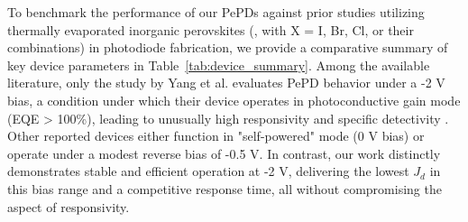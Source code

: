 To benchmark the performance of our PePDs against prior studies utilizing thermally evaporated inorganic perovskites (, with X = I, Br, Cl, or their combinations) in photodiode fabrication, we provide a comparative summary of key device parameters in Table~\ref{tab:device_summary}. Among the available literature, only the study by Yang et al. evaluates PePD behavior under a -2 V bias, a condition under which their device operates in photoconductive gain mode (EQE > 100\%), leading to unusually high responsivity and specific detectivity \cite{Yang2019High-QualityApplications}. Other reported devices either function in "self-powered" mode (0 V bias) or operate under a modest reverse bias of -0.5 V. In contrast, our work distinctly demonstrates stable and efficient operation at -2 V, delivering the lowest $J_d$ in this bias range and a competitive response time, all without compromising the aspect of responsivity.



